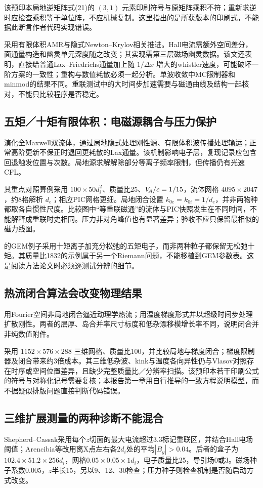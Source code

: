 该预印本局地逆矩阵式(21)的 $(3,1)$ 元素印刷符号与原矩阵乘积不符；重新求逆时应检查乘积等于单位阵，不应机械复制。这里指出的是所获版本的印刷式，不能据此断言作者代码实现错误。

\citet{Toth2008}采用有限体积AMR与隐式Newton--Krylov相关推进。Hall电流需额外空间差分，面通量构造和幽灵单元深度随之改变；其实现需第三层磁场幽灵数据。该文还表明，直接给普通Lax--Friedrichs通量加上随 $1/\Delta x$ 增大的whistler速度，可能破坏一阶方案的一致性；重构与数值耗散必须一起分析。单波收敛中MC限制器和minmod的结果不同。重联测试中的大时间步加速需要与磁通曲线及结构一起核对，不能只比较程序是否稳定。

\subsection{五矩／十矩有限体积：电磁源耦合与压力保护}
\citet{Wang2015}演化全Maxwell双流体，通过局地隐式处理刚性源、有限体积波传播处理输运；正常高阶更新不保正时退回更耗散的Lax通量。该机制影响电子层，复现记录应包含回退触发位置与次数。局地源求解解除部分等离子频率限制，但传播仍有光速CFL。

其重点对照算例采用 $100\times50d_i^2$、质量比25、$V_{\!A}/c=1/15$，流体网格 $4095\times2047$，约8格解析 $d_e$；相应PIC网格更细。局地闭合设置 $k_{0e}=k_{0i}=1/d_e$，并非两物种都取各自惯性尺度。比较图中“等重联磁通”的流体与PIC快照发生在不同时间，不能解释成重联时史相同。压力非对角峰值也有显著差异；验收不应只保留最相似的磁力线图。

\citet{Hakim2008}的GEM例子采用十矩离子加充分松弛的五矩电子，而非两种粒子都保留无松弛十矩。其质量比1832的示例属于另一个Riemann问题，不能移植到GEM参数表。这是阅读方法论文时必须逐测试分辨的细节。

\subsection{热流闭合算法会改变物理结果}
\citet{Ng2017}用Fourier空间非局地闭合逼近动理学热流；\citet{Ng2020}用温度梯度形式并以超级时间步处理扩散刚性。两者的层厚、岛合并率尺寸标度和低杂漂移模增长率不同，说明闭合并非纯数值附件。

\citet{Closure2026}采用 $1152\times576\times288$ 三维网格、质量比100，并比较局地与梯度闭合；梯度限制器及闭合带来约3倍成本。其三维低杂波、kink与温度各向异性仍与Vlasov对照存在时序或空间位置差异，且缺少完整质量比／分辨率扫描。该预印本若干印刷公式的符号与对称化记号需要复核；本报告第一章用自行推导的一致方程说明模型，而不据疑似排版问题直接判断代码错误。

\subsection{三维扩展测量的两种诊断不能混合}
Shepherd--Cassak采用每个$z$切面的最大电流超过$3.3$标记重联区，并结合Hall电场阈值；Arencibia等改用离X点左右各$2d_i$处的平均$|B_y|>0.04$。后者的盒子为$102.4\times51.2\times256d_i$，网格$0.05\times0.05\times1d_i$，电子质量比25，导引场0或3。磁场种子系数0.005，$z$半长15，另以9、12、30检查；压力种子则检查机制是否随启动方式改变。\citep{Shepherd2012,L275}

